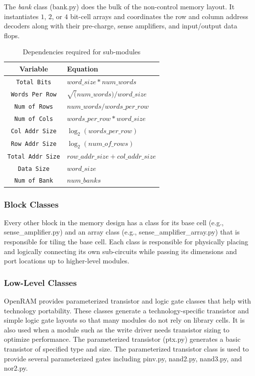 The {\it bank} class (bank.py) does the bulk of the non-control memory layout. It
instantiates $1$, $2$, or $4$ bit-cell arrays and coordinates the row and column
address decoders along with their pre-charge, sense amplifiers, and input/output
data flops.

\begin{table}
\centering
\caption{Dependencies required for sub-modules}
\begin{tabular}{|c|l|} \hline
Variable&Equation \\ \hline
\texttt{Total Bits} & $word\_size*num\_words$ \\ \hline
\texttt{Words Per Row} & $\sqrt(num\_words)/word\_size$ \\ \hline
\texttt{Num of Rows} & $num\_words/words\_per\_row$ \\ \hline
\texttt{Num of Cols} & $words\_per\_row*word\_size$ \\ \hline
\texttt{Col Addr Size} & $\log_2(words\_per\_row)$ \\ \hline
\texttt{Row Addr Size} & $\log_2(num\_of\_rows)$ \\ \hline
\texttt{Total Addr Size} & $row\_addr\_size + col\_addr\_size$ \\ \hline
\texttt{Data Size} & $word\_size$ \\ \hline
\texttt{Num of Bank} & $num\_banks$ \\ \hline
\end{tabular}
\label{table:variables}
\end{table}

\subsubsection{Block Classes}

Every other block in the memory design has a class for its base cell
(e.g., sense\_amplifier.py) and an array class (e.g.,
sense\_amplifier\_array.py) that is responsible for tiling the base
cell. Each class is responsible for physically placing and logically
connecting its own sub-circuits while passing its dimensions and port
locations up to higher-level modules.

\subsubsection{Low-Level Classes}

OpenRAM provides parameterized transistor and logic gate
classes that help with technology portability. These classes generate
a technology-specific transistor and simple logic gate layouts so that
many modules do not rely on library cells. It is also used
when a module such as the write driver needs transistor sizing
to optimize performance. The parameterized transistor (ptx.py) generates a
basic transistor of specified type and size. The parameterized
transistor class is used to provide several parameterized gates
including pinv.py, nand2.py, nand3.py, and nor2.py.

